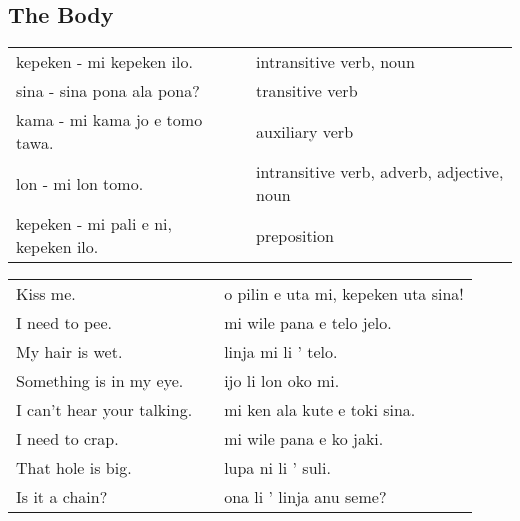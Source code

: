 \newpage

\subsection*{The Body}
\label{'the_body'}

\begin{supertabular}{p{5,5cm}|ll}
    kepeken - mi kepeken ilo.            &  & intransitive verb, noun                    \\
    sina - sina pona ala pona?           &  & transitive verb                            \\
    kama - mi kama jo e tomo tawa.       &  & auxiliary verb                             \\
    lon - mi lon tomo.                   &  & intransitive verb, adverb, adjective, noun \\
    kepeken - mi pali e ni, kepeken ilo. &  & preposition                                \\
\end{supertabular}

\begin{supertabular}{p{5,5cm}|ll}
    Kiss me.                   &  & o pilin e uta mi, kepeken uta sina! \\
    I need to pee.             &  & mi wile pana e telo jelo.           \\
    My hair is wet.            &  & linja mi li ' telo.                 \\
    Something is in my eye.    &  & ijo li lon oko mi.                  \\
    I can't hear your talking. &  & mi ken ala kute e toki sina.        \\
    I need to crap.            &  & mi wile pana e ko jaki.             \\
    That hole is big.          &  & lupa ni li ' suli.                  \\
    Is it a chain?             &  & ona li ' linja anu seme?            \\
\end{supertabular}

